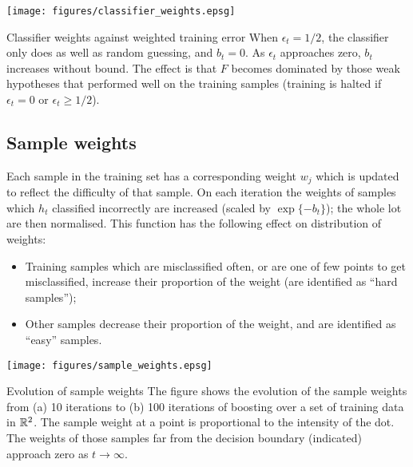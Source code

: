 \begin{linefigure}
\begin{center}
\texttt{[image: figures/classifier\_weights.epsg]}
\end{center}
\begin{capt}{Classifier weights against weighted training error}
When $\epsilon_t = 1/2$, the classifier only does as well as random
guessing, and $b_t = 0$.  As $\epsilon_t$ approaches zero, $b_t$
increases without bound.  The effect is that $F$ becomes dominated by
those weak hypotheses that performed well on the training samples
(training is halted if $\epsilon_t = 0$ or $\epsilon_t \geq
1/2$).
\end{capt}
\end{linefigure}


\subsection{Sample weights}
\label{sec:sample weights}

Each sample in the training set has a corresponding weight $w_j$ which
is updated to reflect the difficulty of that sample.  On each iteration the
weights of samples which $h_t$ classified incorrectly are increased
(scaled by $\exp \{ -b_t \}$); the whole lot are then normalised.
This function has the following effect on distribution of weights:

\begin{itemize}

\item	Training samples which are misclassified often, or are one of 
	few points to get misclassified, increase their proportion of
	the weight (are identified as ``hard samples'');

\item	Other samples decrease their proportion of the weight, and are
	identified as ``easy'' samples.

\end{itemize}

\begin{linefigure}
\begin{center}
\texttt{[image: figures/sample\_weights.epsg]}
\end{center}
\begin{capt}{Evolution of sample weights}
The figure shows the evolution of the sample weights from (a) 10
iterations to (b) 100 iterations of boosting over a set of training
data in $\mathbb{R}^2$.  The sample weight at a point is proportional to the
intensity of the dot.  The weights of those samples far from the
decision boundary (indicated) approach zero as $t \rightarrow \infty$.
\end{capt}
\end{linefigure}

